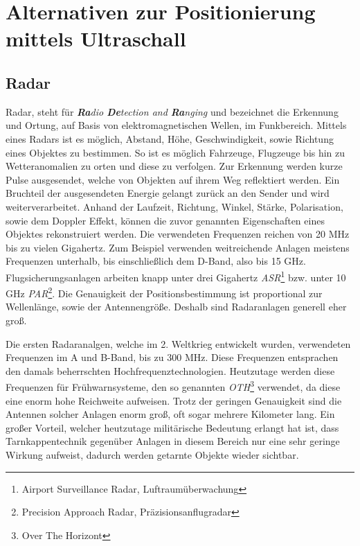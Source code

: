 \chapter{Alternativen zur Positionierung mittels Ultraschall}
\label{cha:Alternativen}
\section{Radar}
Radar, steht für \emph{\textbf{Ra}dio \textbf{De}tection and \textbf{Ra}nging} und bezeichnet die Erkennung und Ortung, auf Basis von elektromagnetischen Wellen, im Funkbereich.
Mittels eines Radars ist es möglich, Abstand, Höhe, Geschwindigkeit, sowie Richtung eines Objektes zu bestimmen. So ist es möglich Fahrzeuge, Flugzeuge bis hin zu Wetteranomalien zu orten und diese zu verfolgen.
Zur Erkennung werden kurze Pulse ausgesendet, welche von Objekten auf ihrem Weg reflektiert werden. Ein Bruchteil der ausgesendeten Energie gelangt zurück an den Sender und wird weiterverarbeitet. Anhand der Laufzeit, Richtung, Winkel, Stärke, Polarisation, sowie dem Doppler Effekt, können die zuvor genannten Eigenschaften eines Objektes rekonstruiert werden. Die verwendeten Frequenzen reichen von 20 MHz bis zu vielen Gigahertz. Zum Beispiel verwenden weitreichende Anlagen meistens Frequenzen unterhalb, bis einschließlich dem D-Band, also bis 15 GHz.
Flugsicherungsanlagen arbeiten knapp unter drei Gigahertz \emph{ASR}\footnote{Airport Surveillance Radar, Luftraumüberwachung} bzw. unter 10 GHz \emph{PAR}\footnote{Precision Approach Radar, Präzisionsanflugradar}. Die Genauigkeit der Positionsbestimmung ist proportional zur Wellenlänge, sowie der Antennengröße. Deshalb sind Radaranlagen generell eher groß.

Die ersten Radaranalgen, welche im 2. Weltkrieg entwickelt wurden, verwendeten Frequenzen im A und B-Band, bis zu 300 MHz. Diese Frequenzen entsprachen den damals beherrschten Hochfrequenztechnologien. Heutzutage werden diese Frequenzen für Frühwarnsysteme, den so genannten \emph{OTH}\footnote{Over The Horizont} verwendet, da diese eine enorm hohe Reichweite aufweisen. Trotz der geringen Genauigkeit sind die Antennen solcher Anlagen enorm groß, oft sogar mehrere Kilometer lang.
Ein großer Vorteil, welcher heutzutage militärische Bedeutung erlangt hat ist, dass Tarnkappentechnik gegenüber Anlagen in diesem Bereich nur eine sehr geringe Wirkung aufweist, dadurch werden getarnte Objekte wieder sichtbar.

